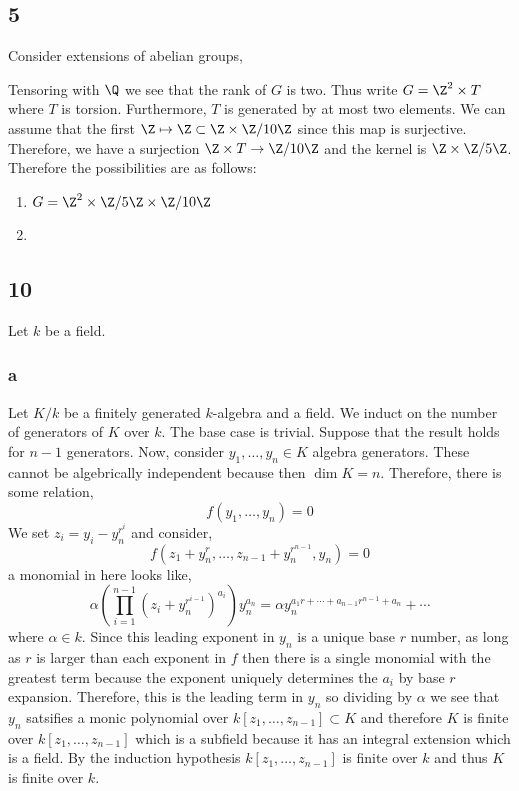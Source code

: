 \documentclass[12pt]{article}
\begin{document}
\subsection{5}

Consider extensions of abelian groups,
\begin{center}
\end{center}
Tensoring with $\Q$ we see that the rank of $G$ is two. Thus write $G = \Z^2 \times T$ where $T$ is torsion. Furthermore, $T$ is generated by at most two elements. We can assume that the first $\Z \mapsto \Z \subset \Z \times \Z / 10 \Z$ since this map is surjective. Therefore, we have a surjection $\Z \times T \to \Z / 10 \Z$ and the kernel is $\Z \times \Z / 5 \Z$. Therefore the possibilities are as follows:
\begin{enumerate}
\item $G = \Z^2 \times \Z / 5 \Z \times \Z / 10 \Z$
\item 
\end{enumerate}

\subsection{10}

Let $k$ be a field.

\subsubsection{a}

Let $K / k$ be a finitely generated $k$-algebra and a field. We induct on the number of generators of $K$ over $k$. The base case is trivial. Suppose that the result holds for $n-1$ generators. Now, consider $y_1, \dots, y_n \in K$ algebra generators. These cannot be algebrically independent because then $\dim{K} = n$. Therefore, there is some relation,
\[ f(y_1, \dots, y_n) = 0 \]
We set $z_i = y_i - y_n^{r^{i}}$ and consider,
\[ f(z_1 + y_n^r, \dots, z_{n-1} + y_n^{r^{n-1}}, y_n) = 0 \]
a monomial in here looks like,
\[ \alpha \left( \prod_{i = 1}^{n-1} (z_i + y_n^{r^{i-1}})^{a_i} \right) y_n^{a_n} = \alpha y_n^{a_1 r + \cdots + a_{n-1} r^{n-1} + a_n} + \cdots \]
where $\alpha \in k$. Since this leading exponent in $y_n$ is a unique base $r$ number, as long as $r$ is larger than each exponent in $f$ then there is a single monomial with the greatest term because the exponent uniquely determines the $a_i$ by base $r$ expansion. Therefore, this is the leading term in $y_n$ so dividing by $\alpha$ we see that $y_n$ satsifies a monic polynomial over $k[z_1, \dots, z_{n-1}] \subset K$ and therefore $K$ is finite over $k[z_1, \dots, z_{n-1}]$ which is a subfield because it has an integral extension which is a field. By the induction hypothesis $k[z_1, \dots, z_{n-1}]$ is finite over $k$ and thus $K$ is finite over $k$.
\end{document}
